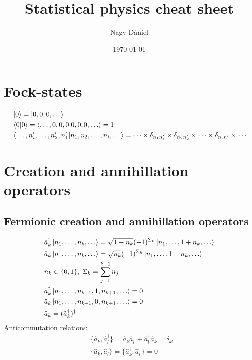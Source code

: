 \documentclass[11pt, a4paper]{article}
\title{Statistical physics cheat sheet}
\author{Nagy Dániel}
\date{\today}
\begin{document}
\maketitle
\newpage

\section{Fock-states}
\begin{align*}
    &\ket 0 = \ket{0,0,0,\dots} \\
    &\braket{0|0} = \braket{\dots,0,0,0|0,0,0,\dots} = 1\\
    &\braket{\dots, n_i', \dots, n_2', n_1' | n_1, n_2, \dots, n_i, \dots}
    = \cdots\times\delta_{n_1n_1'}\times\delta_{n_2n_2'}\times\cdots\times\delta_{n_in_i'}\times\cdots
\end{align*}

\section{Creation and annihillation operators}
\subsection{Fermionic creation and annihillation operators}
\begin{align*}
    &\hat a_k^{\dagger} \ket{n_1, \dots, n_k, \dots} = \sqrt{1-n_k} (-1)^{\Sigma_k} \ket{n_1, \dots, 1 + n_k, \dots} \\
    &\hat a_k \ket{n_1, \dots, n_k, \dots} = \sqrt{n_k} (-1)^{\Sigma_k} \ket{n_1, \dots, 1 - n_k, \dots}\\
    &n_k \in \{0,1\},~ \Sigma_k = \sum\limits_{j=1}^{k-1}n_j \\
    &\hat a_k^{\dagger} \ket{n_1, \dots, n_{k-1}, 1, n_{k+1},\dots} = 0 \\
    &\hat a_k \ket{n_1, \dots, n_{k-1}, 0, n_{k+1},\dots} = 0\\
    &\hat a_k = (\hat a_k^{\dagger})^{\dagger}
\end{align*}
Anticommutation relations:
\begin{align*}
    &\{\hat a_k, \hat a_l^{\dagger}\}  = \hat a_k\hat a_l^{\dagger}+\hat a_l^{\dagger}\hat a_k = \delta_{kl}\\
    &\{\hat a_k, \hat a_l\} = \{ \hat a_k^{\dagger}, \hat a_l^{\dagger} \} = 0
\end{align*}
\end{document}
